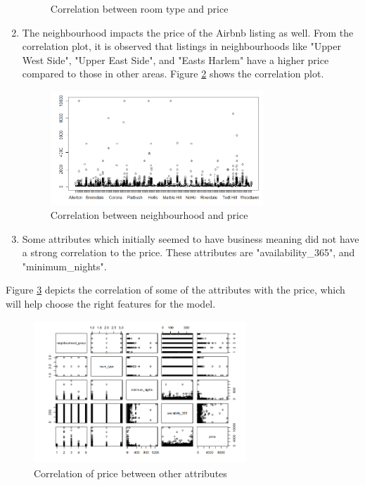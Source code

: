 \documentclass{sig-alternate}
\begin{document}
\begin{enumerate}
\begin{figure}[ht]
		\centering
		\caption{Correlation between room type and price}
		\label{room_type_corr}
	\end{figure}
		\item The neighbourhood impacts the price of the Airbnb listing as well. From the correlation plot, it is observed that listings in neighbourhoods like "Upper West Side", "Upper East Side", and "Easts Harlem" have a higher price compared to those in other areas. Figure \ref{neighborhood_corr} shows the correlation plot.
	\begin{figure}[ht]
		\includegraphics[width=8cm]{neighborhood_corr.png}
		\centering
		\caption{Correlation between neighbourhood and price}
		\label{neighborhood_corr}
	\end{figure}
		\item Some attributes which initially seemed to have business meaning did not have a strong correlation to the price. These attributes are "availability\_365", and "minimum\_nights".
	\end{enumerate}
	Figure \ref{corr} depicts the correlation of some of the attributes with the price, which will help choose the right features for the model. 
	\begin{figure}[ht]
		\includegraphics[width=8cm]{corr.png}
		\centering
		\caption{Correlation of price between other attributes}
		\label{corr}
	\end{figure}
\end{document}
